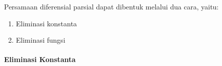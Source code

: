 
Persamaan diferensial parsial dapat dibentuk melalui dua cara, yaitu:

\begin{enumerate}[1.]

	\item Eliminasi konstanta
	\item Eliminasi fungsi

\end{enumerate}

\paragraph{Eliminasi Konstanta}
\label{parff:PDPEK}

